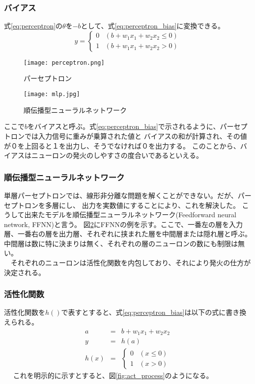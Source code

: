 \documentclass[twocolumn,fleqn]{jsarticle}
\begin{document}
\subsubsection{バイアス}
式\ref{eq:perceptron}の$\theta$を$-b$として、式\ref{eq:perceptron_bias}に変換できる。
\begin{equation}
        y = \begin{cases}
            0 & (b + w_1x_1 + w_2x_2 \leq 0) \\
            1 & (b + w_1x_1 + w_2x_2 > 0)
        \end{cases}
        \label{eq:perceptron_bias}
\end{equation}

\begin{figure}[b]
\centering
\texttt{[image: perceptron.png]}
\caption{パーセプトロン}
\label{fig:neuron}
\end{figure}

\begin{figure}[tb]
\centering
\texttt{[image: mlp.jpg]}
\caption{順伝播型ニューラルネットワーク}
\label{fig:FFNN}
\end{figure}

ここで$b$をバイアスと呼ぶ。式\ref{eq:perceptron_bias}で示されるように、パーセプトロンでは入力信号に重みが乗算された値と
バイアスの和が計算され、その値が０を上回ると１を出力し、そうでなければ０を出力する。
このことから、バイアスはニューロンの発火のしやすさの度合いであるといえる。

\subsubsection{順伝播型ニューラルネットワーク}
単層パーセプトロンでは、線形非分離な問題を解くことができない。だが、パーセプトロンを多層にし、
出力を実数値にすることにより、これを解決した。
こうして出来たモデルを順伝播型ニューラルネットワーク(Feedforward neural network, FFNN)と言う。
図\ref{fig:FFNN}にFFNNの例を示す。ここで、一番左の層を入力層、一番右の層を出力層、それぞれに挟まれた層を中間層または隠れ層と呼ぶ。
中間層は数に特に決まりは無く、それぞれの層のニューロンの数にも制限は無い。\\
　それぞれのニューロンは活性化関数を内包しており、それにより発火の仕方が決定される。

\subsubsection{活性化関数}
活性化関数を$h()$で表すとすると、式\ref{eq:perceptron_bias}は以下の式に書き換えられる。
\begin{eqnarray}
    a & = & b + w_1x_1 + w_2x_2 \\
    y & = & h(a)\\
    h(x) & = & \begin{cases}
        0 & (x \leq 0) \\
        1 & (x > 0)
    \end{cases}
    \label{eq:step}
\end{eqnarray}　
これを明示的に示すとすると、図\ref{fig:act_process}のようになる。
\end{document}
